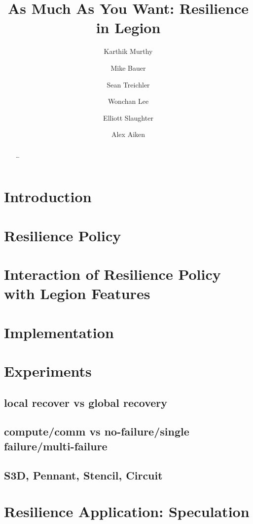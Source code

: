 \documentclass{llncs}
\begin{document}
\mainmatter              %
%
\title{As Much As You Want: Resilience in Legion}
%
 
\author{Karthik Murthy \and
Mike Bauer \and 
Sean Treichler \and
Wonchan Lee \and
Elliott Slaughter \and
Alex Aiken
}
%

\maketitle              %

\begin{abstract}
\dots
{}
\end{abstract}
%
\section{Introduction}
\section{Resilience Policy}
\section{Interaction of Resilience Policy with Legion Features}
\section{Implementation}
\section{Experiments}
\subsection{local recover vs global recovery}
\subsection{compute/comm vs no-failure/single failure/multi-failure}
\subsection{S3D, Pennant, Stencil, Circuit}
\section{Resilience Application: Speculation}
\end{document}
